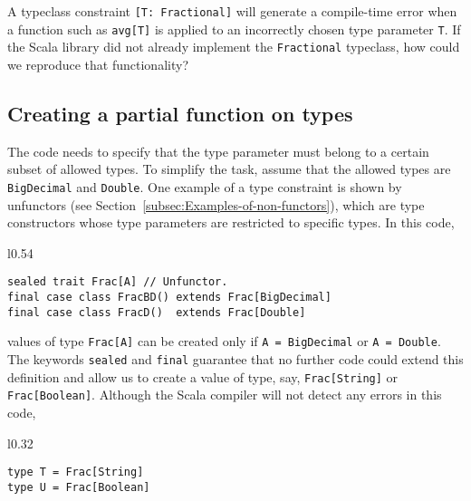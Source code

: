 A typeclass constraint \lstinline![T: Fractional]! will generate
a compile-time error when a function such as \lstinline!avg[T]! is
applied to an incorrectly chosen type parameter \lstinline!T!. If
the Scala library did not already implement the \lstinline!Fractional!
typeclass, how could we reproduce that functionality?

\subsection{Creating a partial function on types}

The code needs to specify that the type parameter must belong to a
certain subset of allowed types. To simplify the task, assume that
the allowed types are \lstinline!BigDecimal! and \lstinline!Double!.
One example of a type constraint is shown by unfunctors
(see Section~\ref{subsec:Examples-of-non-functors}), which are type
constructors whose type parameters are restricted to specific types.
In this code,

\begin{wrapfigure}{l}{0.54\columnwidth}%
\vspace{-0.6\baselineskip}
\begin{lstlisting}
sealed trait Frac[A] // Unfunctor.
final case class FracBD() extends Frac[BigDecimal]
final case class FracD()  extends Frac[Double]
\end{lstlisting}

\vspace{-0.75\baselineskip}
\end{wrapfigure}%

\noindent values of type \lstinline!Frac[A]! can be created only
if \lstinline!A = BigDecimal! or \lstinline!A = Double!. The keywords
\lstinline!sealed! and \lstinline!final! guarantee that no further
code could extend this definition and allow us to create a value of
type, say, \lstinline!Frac[String]! or \lstinline!Frac[Boolean]!.
Although the Scala compiler will not detect any errors in this code,

\begin{wrapfigure}{l}{0.32\columnwidth}%
\vspace{-0.75\baselineskip}
\begin{lstlisting}
type T = Frac[String]
type U = Frac[Boolean]
\end{lstlisting}

\vspace{-1\baselineskip}
\end{wrapfigure}%

